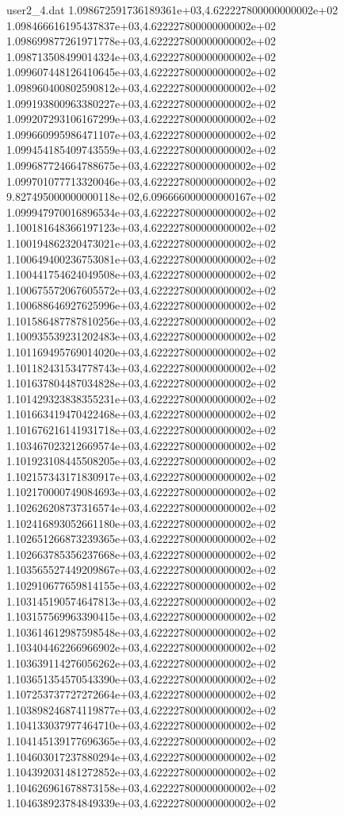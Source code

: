 \begin{filecontents}{user2_4.dat}
1.098672591736189361e+03,4.622227800000000002e+02
1.098466616195437837e+03,4.622227800000000002e+02
1.098699877261971778e+03,4.622227800000000002e+02
1.098713508499014324e+03,4.622227800000000002e+02
1.099607448126410645e+03,4.622227800000000002e+02
1.098960400802590812e+03,4.622227800000000002e+02
1.099193800963380227e+03,4.622227800000000002e+02
1.099207293106167299e+03,4.622227800000000002e+02
1.099660995986471107e+03,4.622227800000000002e+02
1.099454185409743559e+03,4.622227800000000002e+02
1.099687724664788675e+03,4.622227800000000002e+02
1.099701077713320046e+03,4.622227800000000002e+02
9.827495000000000118e+02,6.096666000000000167e+02
1.099947970016896534e+03,4.622227800000000002e+02
1.100181648366197123e+03,4.622227800000000002e+02
1.100194862320473021e+03,4.622227800000000002e+02
1.100649400236753081e+03,4.622227800000000002e+02
1.100441754624049508e+03,4.622227800000000002e+02
1.100675572067605572e+03,4.622227800000000002e+02
1.100688646927625996e+03,4.622227800000000002e+02
1.101586487787810256e+03,4.622227800000000002e+02
1.100935539231202483e+03,4.622227800000000002e+02
1.101169495769014020e+03,4.622227800000000002e+02
1.101182431534778743e+03,4.622227800000000002e+02
1.101637804487034828e+03,4.622227800000000002e+02
1.101429323838355231e+03,4.622227800000000002e+02
1.101663419470422468e+03,4.622227800000000002e+02
1.101676216141931718e+03,4.622227800000000002e+02
1.103467023212669574e+03,4.622227800000000002e+02
1.101923108445508205e+03,4.622227800000000002e+02
1.102157343171830917e+03,4.622227800000000002e+02
1.102170000749084693e+03,4.622227800000000002e+02
1.102626208737316574e+03,4.622227800000000002e+02
1.102416893052661180e+03,4.622227800000000002e+02
1.102651266873239365e+03,4.622227800000000002e+02
1.102663785356237668e+03,4.622227800000000002e+02
1.103565527449209867e+03,4.622227800000000002e+02
1.102910677659814155e+03,4.622227800000000002e+02
1.103145190574647813e+03,4.622227800000000002e+02
1.103157569963390415e+03,4.622227800000000002e+02
1.103614612987598548e+03,4.622227800000000002e+02
1.103404462266966902e+03,4.622227800000000002e+02
1.103639114276056262e+03,4.622227800000000002e+02
1.103651354570543390e+03,4.622227800000000002e+02
1.107253737727272664e+03,4.622227800000000002e+02
1.103898246874119877e+03,4.622227800000000002e+02
1.104133037977464710e+03,4.622227800000000002e+02
1.104145139177696365e+03,4.622227800000000002e+02
1.104603017237880294e+03,4.622227800000000002e+02
1.104392031481272852e+03,4.622227800000000002e+02
1.104626961678873158e+03,4.622227800000000002e+02
1.104638923784849339e+03,4.622227800000000002e+02

\end{filecontents}
